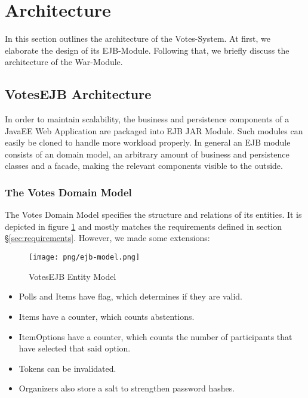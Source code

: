 \section{Architecture}
\label{sec:architecture}

In this section outlines the architecture of the Votes-System.
At first, we elaborate the design of its EJB-Module.
Following that, we briefly discuss the architecture of the War-Module.


\subsection{VotesEJB Architecture}
\label{subsec:votesejb-architector}
In order to maintain scalability, the business and persistence components of a JavaEE Web Application are packaged into EJB JAR Module.
Such modules can easily be cloned to handle more workload properly.
In general an EJB module consists of an domain model, an arbitrary amount of business and persistence classes and a facade, making the relevant components visible to the outside.

\subsubsection{The Votes Domain Model}
\label{subsubsec:the-votes-domain-model}
The Votes Domain Model specifies the structure and relations of its entities.
It is depicted in figure \ref{figure:ejb-model} and mostly matches the requirements defined in section §\ref{sec:requirements}.
However, we made some extensions:

\begin{figure}[h]
\centering
\texttt{[image: png/ejb-model.png]}
\caption{VotesEJB Entity Model}
\label{figure:ejb-model}
\end{figure}

\begin{itemize}

\item
Polls and Items have flag, which determines if they are valid.

\item
Items have a counter, which counts abstentions.

\item
ItemOptions have a counter, which counts the number of participants that have selected that said option.

\item
Tokens can be invalidated.

\item
Organizers also store a salt to strengthen password hashes.

\end{itemize}



